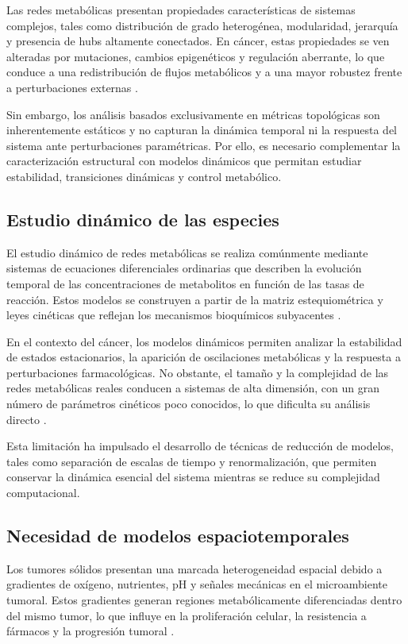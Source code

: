 \documentclass[12pt,spanish]{article}
\begin{document}
	Las redes metabólicas presentan propiedades características de sistemas complejos, tales como distribución de grado heterogénea, modularidad, jerarquía y presencia de hubs altamente conectados. En cáncer, estas propiedades se ven alteradas por mutaciones, cambios epigenéticos y regulación aberrante, lo que conduce a una redistribución de flujos metabólicos y a una mayor robustez frente a perturbaciones externas \cite{Resendis2010}.
	
	Sin embargo, los análisis basados exclusivamente en métricas topológicas son inherentemente estáticos y no capturan la dinámica temporal ni la respuesta del sistema ante perturbaciones paramétricas. Por ello, es necesario complementar la caracterización estructural con modelos dinámicos que permitan estudiar estabilidad, transiciones dinámicas y control metabólico.
	
	\subsection{Estudio dinámico de las especies}
	
	El estudio dinámico de redes metabólicas se realiza comúnmente mediante sistemas de ecuaciones diferenciales ordinarias que describen la evolución temporal de las concentraciones de metabolitos en función de las tasas de reacción. Estos modelos se construyen a partir de la matriz estequiométrica y leyes cinéticas que reflejan los mecanismos bioquímicos subyacentes \cite{Liebermeister2010}.
	
	En el contexto del cáncer, los modelos dinámicos permiten analizar la estabilidad de estados estacionarios, la aparición de oscilaciones metabólicas y la respuesta a perturbaciones farmacológicas. No obstante, el tamaño y la complejidad de las redes metabólicas reales conducen a sistemas de alta dimensión, con un gran número de parámetros cinéticos poco conocidos, lo que dificulta su análisis directo \cite{Cornish2013}.
	
	Esta limitación ha impulsado el desarrollo de técnicas de reducción de modelos, tales como separación de escalas de tiempo y renormalización, que permiten conservar la dinámica esencial del sistema mientras se reduce su complejidad computacional.
	
	\subsection{Necesidad de modelos espaciotemporales}
	
	Los tumores sólidos presentan una marcada heterogeneidad espacial debido a gradientes de oxígeno, nutrientes, pH y señales mecánicas en el microambiente tumoral. Estos gradientes generan regiones metabólicamente diferenciadas dentro del mismo tumor, lo que influye en la proliferación celular, la resistencia a fármacos y la progresión tumoral \cite{Gatenby2004,Swartz2013}.
	
\end{document}
